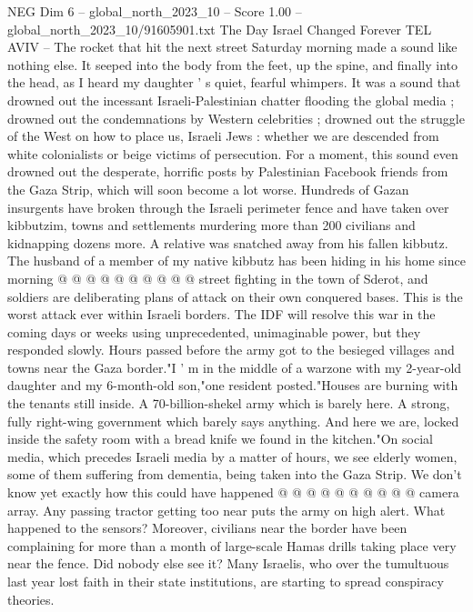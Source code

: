 \begin{textsample}{NEG Dim 6 – global\_north\_2023\_10 – Score 1.00 – global\_north\_2023\_10/91605901.txt}  \label{ex:f6_neg_203}
The Day Israel Changed Forever TEL AVIV -- The rocket that hit the next street Saturday morning made a sound like nothing else.
It seeped into the body from the feet, up the spine, and finally into the head, as I heard my daughter ' s quiet, fearful whimpers.
It was a sound that drowned out the incessant Israeli-Palestinian chatter flooding the global media ; drowned out the condemnations by Western celebrities ; drowned out the struggle of the West on how to place us, Israeli Jews : whether we are descended from white colonialists or beige victims of persecution.
For a moment, this sound even drowned out the desperate, horrific posts by Palestinian Facebook friends from the Gaza Strip, which will soon become a lot worse.
Hundreds of Gazan insurgents have broken through the Israeli perimeter fence and have taken over kibbutzim, towns and settlements murdering more than 200 civilians and kidnapping dozens more.
A relative was snatched away from his fallen kibbutz.
The husband of a member of my native kibbutz has been hiding in his home since morning @ @ @ @ @ @ @ @ @ @ street fighting in the town of Sderot, and soldiers are deliberating plans of attack on their own conquered bases.
This is the worst attack ever within Israeli borders.
The IDF will resolve this war in the coming days or weeks using unprecedented, unimaginable power, but they responded slowly.
Hours passed before the army got to the besieged villages and towns near the Gaza border."I ' m in the middle of a warzone with my 2-year-old daughter and my 6-month-old son,"one resident posted."Houses are burning with the tenants still inside.
A 70-billion-shekel army which is barely here.
A strong, fully right-wing government which barely says anything.
And here we are, locked inside the safety room with a bread knife we found in the kitchen."On social media, which precedes Israeli media by a matter of hours, we see elderly women, some of them suffering from dementia, being taken into the Gaza Strip.
We don't know yet exactly how this could have happened @ @ @ @ @ @ @ @ @ @ camera array.
Any passing tractor getting too near puts the army on high alert.
What happened to the sensors?
Moreover, civilians near the border have been complaining for more than a month of large-scale Hamas drills taking place very near the fence.
Did nobody else see it?
Many Israelis, who over the tumultuous last year lost faith in their state institutions, are starting to spread conspiracy theories.

\end{textsample}
